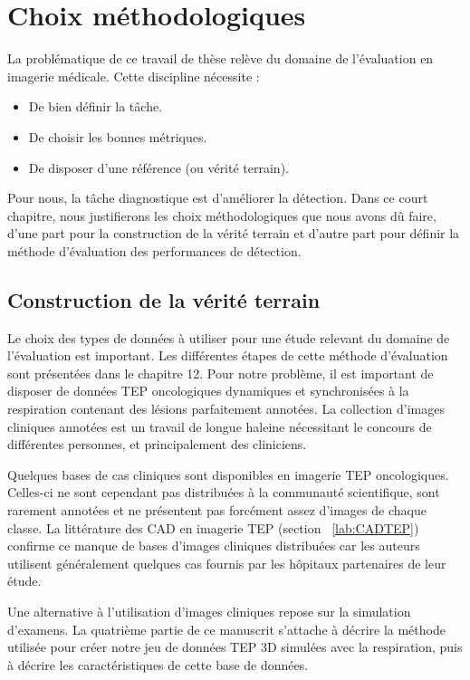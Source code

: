 \chapter{Choix méthodologiques}


La problématique de ce travail de thèse relève du domaine de l'évaluation en imagerie médicale. Cette discipline nécessite :

\begin{itemize}
 \item De bien définir la tâche.
 \item De choisir les bonnes métriques.
 \item De disposer d'une référence (ou vérité terrain).
\end{itemize}

Pour nous, la tâche diagnostique est d'améliorer la détection. Dans ce court chapitre, nous justifierons les choix méthodologiques que nous avons dû faire, d'une part pour la construction de la vérité terrain et d'autre part pour définir la méthode d'évaluation des performances de détection.

\section{Construction de la vérité terrain}

Le choix des types de données à utiliser pour une étude relevant du domaine de l'évaluation est important. Les différentes étapes de cette méthode d'évaluation sont présentées dans le chapitre 12. Pour notre problème, il est important de disposer de données TEP oncologiques dynamiques et synchronisées à la respiration contenant des lésions parfaitement annotées. La collection d’images cliniques annotées est un travail de longue haleine nécessitant le concours de différentes personnes, et principalement des cliniciens. 


Quelques bases de cas cliniques sont disponibles en imagerie TEP oncologiques. Celles-ci ne sont cependant pas distribuées à la communauté scientifique, sont rarement annotées et ne présentent pas forcément assez d’images de chaque classe. La littérature des CAD en imagerie TEP (section ~\ref{lab:CADTEP}) confirme ce manque de bases d’images cliniques distribuées car les auteurs utilisent généralement quelques cas fournis par les hôpitaux partenaires de leur étude. 

Une alternative à l’utilisation d’images cliniques repose sur la simulation d’examens. La quatrième partie de ce manuscrit s'attache à décrire la méthode utilisée pour créer notre jeu de données TEP 3D simulées avec la respiration, puis à décrire les caractéristiques de cette base de données.

